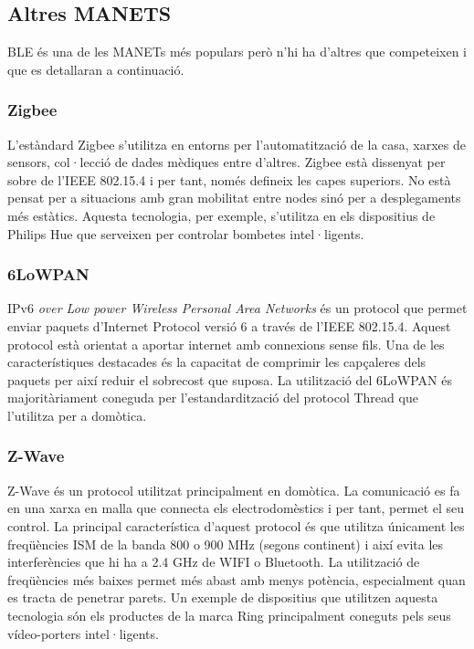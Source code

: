 \subsection{Altres MANETS}
BLE és una de les MANETs més populars però n'hi ha d'altres que competeixen i que es detallaran a continuació.

\subsubsection{Zigbee}
L'estàndard Zigbee s'utilitza en entorns per l'automatització de la casa, xarxes de sensors, col·lecció de dades mèdiques entre d'altres.
Zigbee està dissenyat per sobre de l'IEEE 802.15.4\footnotemark{} i per tant, només defineix les capes superiors.
No està pensat per a situacions amb gran mobilitat entre nodes sinó per a desplegaments més estàtics.
Aquesta tecnologia, per exemple, s'utilitza en els dispositius de Philips Hue que serveixen per controlar bombetes intel·ligents.

\subsubsection{6LoWPAN}
IPv6 \textit{over Low power Wireless Personal Area Networks} és un protocol que permet enviar paquets d'Internet Protocol versió 6 a través de l'IEEE 802.15.4\footnotemark[\value{footnote}].
Aquest protocol està orientat a aportar internet amb connexions sense fils.
Una de les característiques destacades és la capacitat de comprimir les capçaleres dels paquets per així reduir el sobrecost que suposa.
La utilització del 6LoWPAN és majoritàriament coneguda per l'estandardització del protocol Thread que l'utilitza per a domòtica.


\subsubsection{Z-Wave}
Z-Wave és un protocol utilitzat principalment en domòtica. La comunicació es fa en una xarxa en malla que connecta els electrodomèstics i per tant, permet el seu control.
La principal característica d'aquest protocol és que utilitza únicament les freqüències ISM de la banda 800 o 900 MHz (segons continent) i així evita les interferències que hi ha a 2.4 GHz de WIFI o Bluetooth.
La utilització de freqüències més baixes permet més abast amb menys potència, especialment quan es tracta de penetrar parets.
Un exemple de dispositius que utilitzen aquesta tecnologia són els productes de la marca Ring principalment coneguts pels seus vídeo-porters intel·ligents.

